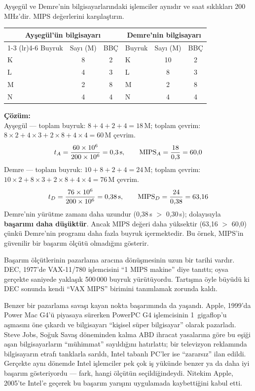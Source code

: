 \begin{ornek}[2.5]
Ayşegül ve Demre'nin bilgisayarlarındaki işlemciler aynıdır ve saat sıklıkları 200\,MHz'dir. MIPS değerlerini karşılaştırın.

\begin{center}
\begin{tabular}{lcclcc}
\toprule
\multicolumn{3}{c}{\textbf{Ayşegül'ün bilgisayarı}} & \multicolumn{3}{c}{\textbf{Demre'nin bilgisayarı}} \\
\cmidrule(lr){1-3} \cmidrule(lr){4-6}
Buyruk & Sayı (M) & BBÇ & Buyruk & Sayı (M) & BBÇ \\
\midrule
K & 8  & 2 & K & 10 & 2 \\
L & 4  & 3 & L & 8  & 3 \\
M & 2  & 8 & M & 2  & 8 \\
N & 4  & 4 & N & 4  & 4 \\
\bottomrule
\end{tabular}
\end{center}

\textbf{Çözüm:}\\
Ayşegül --- toplam buyruk: $8+4+2+4 = 18$\,M; toplam çevrim: $8 \times 2 + 4 \times 3 + 2 \times 8 + 4 \times 4 = 60$\,M çevrim.
\[
t_A = \frac{60 \times 10^6}{200 \times 10^6} = 0{,}3 \text{\,s}, \qquad \text{MIPS}_A = \frac{18}{0{,}3} = 60{,}0
\]
Demre --- toplam buyruk: $10+8+2+4 = 24$\,M; toplam çevrim: $10 \times 2 + 8 \times 3 + 2 \times 8 + 4 \times 4 = 76$\,M çevrim.
\[
t_D = \frac{76 \times 10^6}{200 \times 10^6} = 0{,}38 \text{\,s}, \qquad \text{MIPS}_D = \frac{24}{0{,}38} = 63{,}16
\]
Demre'nin yürütme zamanı daha uzundur (0,38\,s $>$ 0,30\,s); dolayısıyla \textbf{başarımı daha düşüktür}. Ancak MIPS değeri daha yüksektir (63,16 $>$ 60,0) çünkü Demre'nin programı daha fazla buyruk içermektedir. Bu örnek, MIPS'in güvenilir bir başarım ölçütü olmadığını gösterir.
\end{ornek}

\begin{bilginot}
Başarım ölçütlerinin pazarlama aracına dönüşmesinin uzun bir tarihi vardır. DEC, 1977'de VAX-11/780 işlemcisini ``1 MIPS makine'' diye tanıttı; oysa gerçekte saniyede yaklaşık 500\,000 buyruk yürütüyordu. Tartışma öyle büyüdü ki DEC sonunda kendi ``VAX MIPS'' birimini tanımlamak zorunda kaldı.

Benzer bir pazarlama savaşı kayan nokta başarımında da yaşandı. Apple, 1999'da Power Mac G4'ü piyasaya sürerken PowerPC G4 işlemcisinin 1~gigaflop'u aşmasını öne çıkardı ve bilgisayarı ``kişisel süper bilgisayar'' olarak pazarladı. Steve Jobs, Soğuk Savaş döneminden kalma ABD ihracat yasalarına göre bu eşiği aşan bilgisayarların ``mühimmat'' sayıldığını hatırlattı; bir televizyon reklamında bilgisayarın etrafı tanklarla sarıldı, Intel tabanlı PC'ler ise ``zararsız'' ilan edildi. Gerçekte aynı dönemde Intel işlemciler pek çok iş yükünde benzer ya da daha iyi başarım gösteriyordu --- fark, hangi ölçütün seçildiğindeydi. Nitekim Apple, 2005'te Intel'e geçerek bu başarım yarışını uygulamada kaybettiğini kabul etti.
\end{bilginot}

